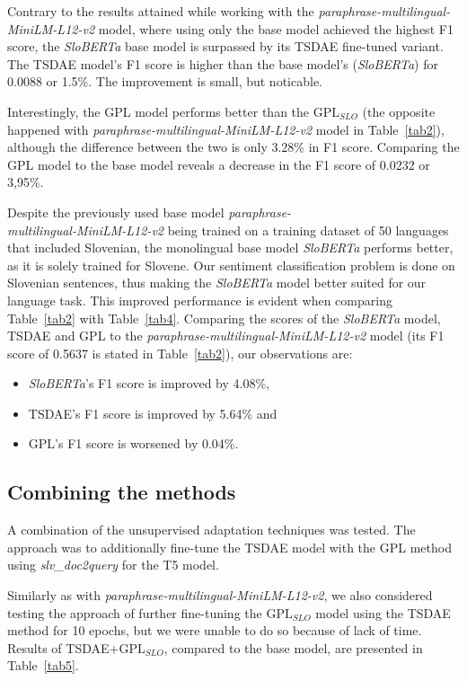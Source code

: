 \documentclass[fleqn,moreauthors,10pt]{ds_report}
\begin{document}
Contrary to the results attained while working with the {\it paraphrase-multilingual-MiniLM-L12-v2} model, where using only the base model achieved the highest F1 score, the {\it SloBERTa} base model is surpassed by its TSDAE fine-tuned variant. The TSDAE model's F1 score is higher than the base model's ({\it SloBERTa}) for 0.0088 or 1.5\%. The improvement is small, but noticable.

Interestingly, the GPL model performs better than the $\text{GPL}_{SLO}$ (the opposite happened with {\it paraphrase-multilingual-MiniLM-L12-v2} model in Table~\ref{tab2}), although the difference between the two is only 3.28\% in F1 score.
Comparing the GPL model to the base model reveals a decrease in the F1 score of 0.0232 or 3,95\%.

Despite the previously used base model {\it paraphrase-\\multilingual-MiniLM-L12-v2} being trained on a training dataset of 50 languages that included Slovenian, the monolingual base model {\it SloBERTa} performs better, as it is solely trained for Slovene. Our sentiment classification problem is done on Slovenian sentences, thus making the {\it SloBERTa} model better suited for our language task. This improved performance is evident when comparing Table~\ref{tab2} with Table~\ref{tab4}. Comparing the scores of the {\it SloBERTa} model, TSDAE and GPL to the {\it paraphrase-multilingual-MiniLM-L12-v2} model (its F1 score of 0.5637 is stated in Table~\ref{tab2}), our observations are:
\begin{itemize}
	\item {\it SloBERTa}'s F1 score is improved by 4.08\%,
	\item TSDAE's F1 score is improved by 5.64\% and
	\item GPL's F1 score is worsened by 0.04\%.
\end{itemize}


\subsection*{Combining the methods}
A combination of the unsupervised adaptation techniques was tested. The approach was to additionally fine-tune the TSDAE model with the GPL method using {\it slv\_doc2query} for the T5 model.

Similarly as with {\it paraphrase-multilingual-MiniLM-L12-v2}, we also considered testing the approach of further fine-tuning the $\text{GPL}_{SLO}$ model using the TSDAE method for 10 epochs, but we were unable to do so because of lack of time. Results of TSDAE+$\text{GPL}_{SLO}$, compared to the base model, are presented in Table~\ref{tab5}.
\end{document}
